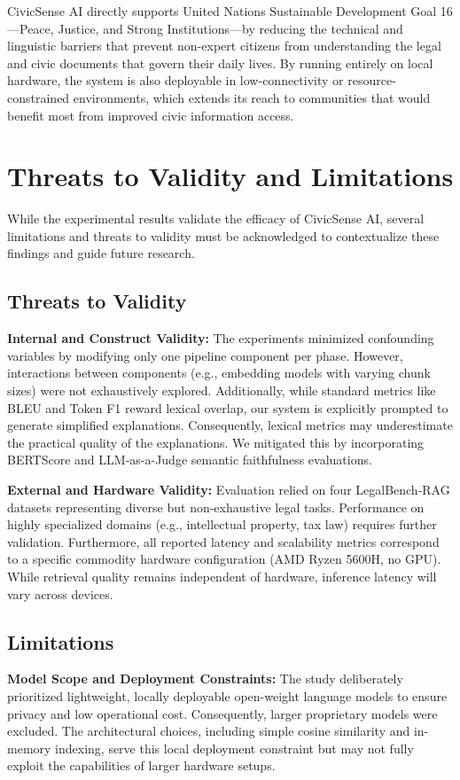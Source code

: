 \documentclass[conference]{IEEEtran}
\begin{document}
CivicSense AI directly supports United Nations Sustainable Development Goal 16---Peace, Justice, and Strong Institutions---by reducing the technical and linguistic barriers that prevent non-expert citizens from understanding the legal and civic documents that govern their daily lives. By running entirely on local hardware, the system is also deployable in low-connectivity or resource-constrained environments, which extends its reach to communities that would benefit most from improved civic information access.

\section{Threats to Validity and Limitations}
\label{sec:threats_limitations}

While the experimental results validate the efficacy of CivicSense AI, several limitations and threats to validity must be acknowledged to contextualize these findings and guide future research.

\subsection{Threats to Validity}
\textbf{Internal and Construct Validity:} The experiments minimized confounding variables by modifying only one pipeline component per phase. However, interactions between components (e.g., embedding models with varying chunk sizes) were not exhaustively explored. Additionally, while standard metrics like BLEU and Token F1 reward lexical overlap, our system is explicitly prompted to generate simplified explanations. Consequently, lexical metrics may underestimate the practical quality of the explanations. We mitigated this by incorporating BERTScore and LLM-as-a-Judge semantic faithfulness evaluations.

\textbf{External and Hardware Validity:} Evaluation relied on four LegalBench-RAG datasets representing diverse but non-exhaustive legal tasks. Performance on highly specialized domains (e.g., intellectual property, tax law) requires further validation. Furthermore, all reported latency and scalability metrics correspond to a specific commodity hardware configuration (AMD Ryzen 5600H, no GPU). While retrieval quality remains independent of hardware, inference latency will vary across devices.

\subsection{Limitations}
\textbf{Model Scope and Deployment Constraints:} The study deliberately prioritized lightweight, locally deployable open-weight language models to ensure privacy and low operational cost. Consequently, larger proprietary models were excluded. The architectural choices, including simple cosine similarity and in-memory indexing, serve this local deployment constraint but may not fully exploit the capabilities of larger hardware setups.
\end{document}
